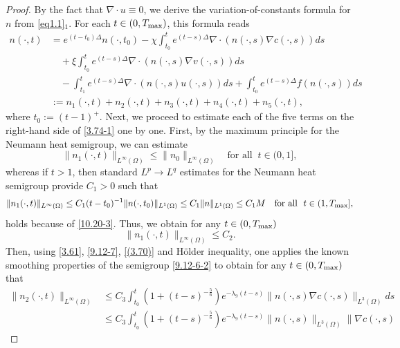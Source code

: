 \documentclass[reqno]{amsart}
\begin{document}
\begin{proof} By the fact that \( \nabla \cdot u \equiv 0 \), we derive the 
variation-of-constants formula for $n$ from \eqref{eq1.1}$_1$. 
For each \( t \in (0,T_{\rm max}) \), this formula reads
\begin{equation}\label{3.74-1}
\begin{aligned}
n(\cdot, t) 
&= e^{(t-t_0)\Delta} n(\cdot,t_0) -\chi \int_{t_0}^t  e^{(t - s)\Delta} \nabla 
 \cdot (n(\cdot, s) \nabla c(\cdot, s)) ds \\
&\quad +\xi \int_{t_0}^t e^{(t - s)\Delta} \nabla \cdot (n(\cdot, s) 
 \nabla v(\cdot, s)) ds \\
&\quad - \int_{t_1}^t  e^{(t - s)\Delta} \nabla \cdot (n(\cdot, s) u(\cdot, s))  ds
+ \int_{t_0}^te^{(t - s)\Delta} f(n(\cdot, s))ds\\
&:= n_1(\cdot,t) + n_2(\cdot,t) + n_3(\cdot,t)+ n_4(\cdot,t)+ n_5(\cdot,t),
\end{aligned}
\end{equation}
where $t_0 := (t-1)^+$. Next, we proceed to estimate each of the five terms on the 
right-hand side of \eqref{3.74-1} one by one. First, by the maximum principle for 
the Neumann heat semigroup, we can estimate
\[
\|n_1(\cdot,t)\|_{L^\infty(\Omega)} \leq \|n_0\|_{L^\infty(\Omega)} \quad 
\text{for\ all }\ t \in (0,1],
\]
whereas if $t > 1$, then standard $L^p \to L^q$ estimates for the Neumann heat 
semigroup provide $C_1> 0$ such that
\[
\|n_1(\cdot,t)\|_{L^\infty(\Omega)} \leq C_1 (t - t_0)^{-1} \|n(\cdot,t_0)
\|_{L^1(\Omega)}\leq C_1 \|n\|_{L^1(\Omega)} \leq C_1M \quad 
\text{for\ all }\ t \in (1,T_{\rm max}],
\]
holds because of \eqref{10.20-3}. Thus, we obtain for any $t\in (0,T_{\rm max})$
\begin{equation}\label{3.75}
\|n_1(\cdot,t)\|_{L^\infty(\Omega)} \leq C_{2}.
\end{equation}
Then, using \eqref{3.61}, \eqref{9.12-7}, \eqref{(3.70)} and H\"{o}lder inequality, 
one applies the known smoothing properties of the semigroup
\eqref{9.12-6-2} to obtain for any $t\in (0,T_{\rm max})$ that
\begin{equation}
\begin{aligned}\label{3.76}
\| n_2(\cdot,t) \|_{L^\infty(\Omega)}
&\leq C_{3} \int_{t_0}^t ( 1 + (t - s)^{-\frac{5}{6}} ) 
 e^{-\lambda_9 (t-s)} \| n(\cdot, s) \nabla c(\cdot, s) \|_{L^{3}(\Omega)} ds \\
&\leq C_{3} \int_{t_0}^t ( 1 + (t - s)^{-\frac{5}{6}} ) 
 e^{-\lambda_9 (t-s)} \| n(\cdot, s) \|_{L^3(\Omega)} \| \nabla c(\cdot, s) 

\end{aligned}
\end{equation}
\end{proof}
\end{document}
